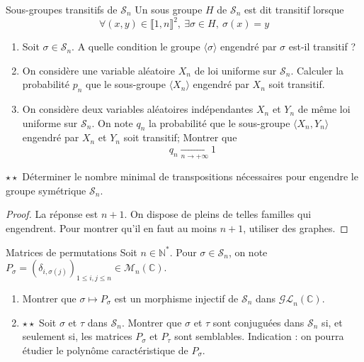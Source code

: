 \documentclass[french,a4paper]{article}
\newcommand{\N}{\mathbb{N}}
\newcommand{\C}{\mathbb{C}}
\newcommand{\st}{^*}
\theoremstyle{plain}
\theoremstyle{definition}
\theoremstyle{remark}
\begin{document}
\begin{ex}[Moulin.27]{Sous-groupes transitifs de $\mathcal{S}_n$}
	Un sous groupe $H$ de $\mathcal{S}_n$ est dit transitif lorsque $$\forall (x,y)\in\llbracket1,n\rrbracket^2,\ \exists\sigma\in H,\ \sigma(x)=y$$
	\begin{enumerate}
		\item Soit $\sigma\in\mathcal{S}_n$. A quelle condition le groupe $\langle\sigma\rangle$ engendré par $\sigma$ est-il transitif ?
		\item On considère une variable aléatoire $X_n$ de loi uniforme sur $\mathcal{S}_n$. Calculer la probabilité $p_n$ que le sous-groupe $\langle X_n\rangle$ engendré par $X_n$ soit transitif.
		\item On considère deux variables aléatoires indépendantes $X_n$ et $Y_n$ de même loi uniforme sur $\mathcal{S}_n$. On note $q_n$ la probabilité que le sous-groupe $\langle X_n,Y_n\rangle$ engendré par $X_n$ et $Y_n$ soit transitif; Montrer que $$q_n\xrightarrow[n\to+\infty]{}1$$
	\end{enumerate}
\end{ex}

\begin{ex}[Moulin.28]{$\star\star$}
	Déterminer le nombre minimal de transpositions nécessaires pour engendre le groupe symétrique $\mathcal{S}_n$.
\end{ex}

\begin{proof}
	La réponse est $n+1$. On dispose de pleins de telles familles qui engendrent. Pour montrer qu'il en faut au moins $n+1$, utiliser des graphes.
\end{proof}

\begin{ex}[Moulin.29]{Matrices de permutations}
	Soit $n\in\N\st$. Pour $\sigma\in\mathcal{S}_n$, on note $P_\sigma=(\delta_{i,\sigma(j)})_{1\leqslant i,j\leqslant n}\in\mathcal{M}_n(\C)$.
	\begin{enumerate}
		\item Montrer que $\sigma\mapsto P_\sigma$ est un morphisme injectif de $\mathcal{S}_n$ dans $\mathcal{GL}_n(\C)$.
		\item $\star\star$ Soit $\sigma$ et $\tau$ dans $\mathcal{S}_n$. Montrer que $\sigma$ et $\tau$ sont conjuguées dans $\mathcal{S}_n$ si, et seulement si, les matrices $P_\sigma$ et $P_\tau$ sont semblables. Indication : on pourra étudier le polynôme caractéristique de $P_\sigma$.
	\end{enumerate}
\end{ex}
\end{document}
